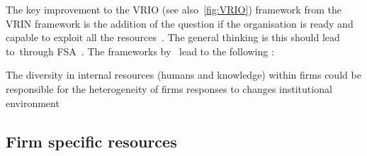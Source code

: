 The key improvement to the VRIO (see also~\ref{fig:VRIO}) framework from the VRIN framework is the addition of the question if the organisation is ready and capable to exploit all the resources~\citep{Barney:1995tz,Strategic-management-insight:2013}.
The general thinking is this should lead to~\ca through \gls{FSA}~\citep{Barney:1991ur,Barney:2001tj,Barney:2011jp}. 
The frameworks by~\cite{Barney:1991ur,Barney:1995tz} lead to the following \wpro:

\begin{WP}\label{wp:rbt}
  The diversity in internal resources (humans and knowledge) within firms could be responsible for the heterogeneity of firms responses to changes institutional environment
\end{WP}

\subsection{Firm specific resources}

